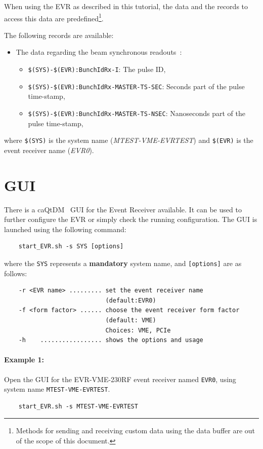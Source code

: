 \documentclass[12pt,a4paper]{article}
\begin{document}
When using the EVR as described in this tutorial, the data and the records to access this data are predefined\footnote{Methods for sending and receiving custom data using the data buffer are out of the scope of this document.}. 

The following records are available:
\begin{itemize}
\item The data regarding the beam synchronous readouts~\cite{bsread}:
	\begin{itemize}
	\item \texttt{\$(SYS)-\$(EVR):BunchIdRx-I}: The pulse ID,
	\item \texttt{\$(SYS)-\$(EVR):BunchIdRx-MASTER-TS-SEC}: Seconds part of the pulse time-stamp,
	\item \texttt{\$(SYS)-\$(EVR):BunchIdRx-MASTER-TS-NSEC}: Nanoseconds part of the pulse time-stamp,
	\end{itemize}
\end{itemize}
where \texttt{\$(SYS)} is the system name (\textit{MTEST-VME-EVRTEST}) and \texttt{\$(EVR)} is the event receiver name (\textit{EVR0}).

\section{GUI}\label{sec:gui} 
There is a caQtDM~\cite{caqtdm} GUI for the Event Receiver available. It can be used to further configure the EVR or simply check the running configuration. The GUI is launched using the following command:

\begin{verbatim}
	start_EVR.sh -s SYS [options]
\end{verbatim}
where the \texttt{SYS} represents a \textbf{mandatory} system name, and \texttt{[options]} are as follows:
\begin{verbatim}
	-r <EVR name> ......... set the event receiver name 
	                        (default:EVR0)
	-f <form factor> ...... choose the event receiver form factor 
	                        (default: VME)
	                        Choices: VME, PCIe
	-h    ................. shows the options and usage
\end{verbatim}


\paragraph{Example 1:} Open the GUI for the EVR-VME-230RF event receiver named \texttt{EVR0}, using system name \texttt{MTEST-VME-EVRTEST}.
\begin{verbatim}
	start_EVR.sh -s MTEST-VME-EVRTEST
\end{verbatim}
\end{document}
